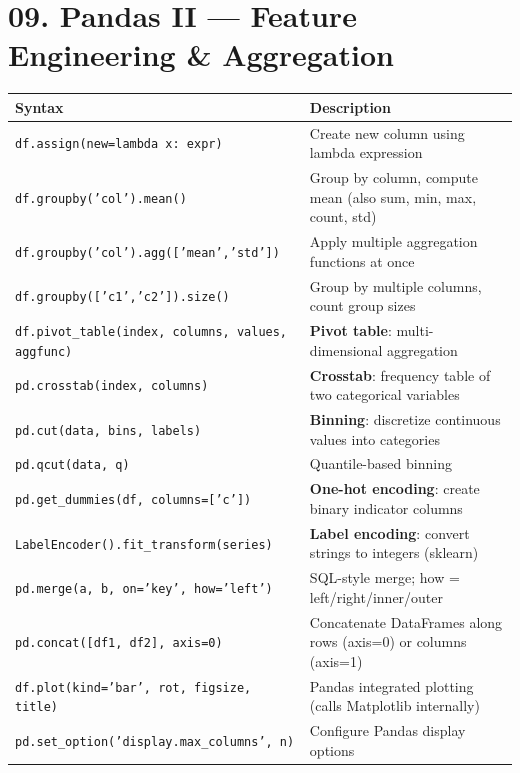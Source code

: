 \documentclass[11pt,a4paper]{report}
\let\oldtexttt\texttt
\renewcommand{\texttt}[1]{\textcolor{mainblue}{\oldtexttt{#1}}}
\begin{document}
\section*{09. Pandas II --- Feature Engineering \& Aggregation}
\small\renewcommand{\arraystretch}{1.3}
\centering
\begin{tabularx}{\textwidth}{@{}lX@{}}
\toprule
\textbf{Syntax} & \textbf{Description} \\ \midrule
\texttt{df.assign(new=lambda x: expr)} & Create new column using lambda expression \\
\texttt{df.groupby('col').mean()} & Group by column, compute mean (also sum, min, max, count, std) \\
\texttt{df.groupby('col').agg(['mean','std'])} & Apply multiple aggregation functions at once \\
\texttt{df.groupby(['c1','c2']).size()} & Group by multiple columns, count group sizes \\
\texttt{df.pivot\_table(index, columns, values, aggfunc)} & \textbf{Pivot table}: multi-dimensional aggregation \\
\texttt{pd.crosstab(index, columns)} & \textbf{Crosstab}: frequency table of two categorical variables \\
\texttt{pd.cut(data, bins, labels)} & \textbf{Binning}: discretize continuous values into categories \\
\texttt{pd.qcut(data, q)} & Quantile-based binning \\
\texttt{pd.get\_dummies(df, columns=['c'])} & \textbf{One-hot encoding}: create binary indicator columns \\
\texttt{LabelEncoder().fit\_transform(series)} & \textbf{Label encoding}: convert strings to integers (sklearn) \\
\texttt{pd.merge(a, b, on='key', how='left')} & SQL-style merge; how = left/right/inner/outer \\
\texttt{pd.concat([df1, df2], axis=0)} & Concatenate DataFrames along rows (axis=0) or columns (axis=1) \\
\texttt{df.plot(kind='bar', rot, figsize, title)} & Pandas integrated plotting (calls Matplotlib internally) \\
\texttt{pd.set\_option('display.max\_columns', n)} & Configure Pandas display options \\
\bottomrule
\end{tabularx}
\normalsize
\end{document}
